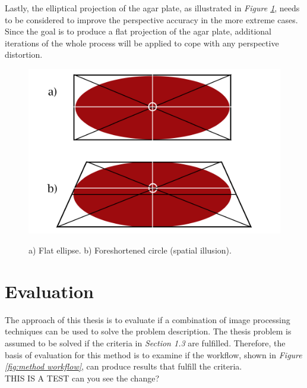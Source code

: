 \noindent Lastly, the elliptical projection of the agar plate, as illustrated in \textit{Figure \ref{fig:method projection}}, needs to be considered to improve the perspective accuracy in the more extreme cases. Since the goal is to produce a flat projection of the agar plate, additional iterations of the whole process will be applied to cope with any perspective distortion.

\begin{figure}[H]
    \centering
    \includegraphics[width=0.5\linewidth]{figures/PDF/Ellipse_projection.pdf}\\
    \caption{a) Flat ellipse. b) Foreshortened circle (spatial illusion).}
    \label{fig:method projection}
\end{figure}



\section{Evaluation}
The approach of this thesis is to evaluate if a combination of image processing techniques can be used to solve the problem description. The thesis problem is assumed to be solved if the criteria in \textit{Section 1.3} are fulfilled. Therefore, the basis of evaluation for this method is to examine if the workflow, shown in \textit{Figure \ref{fig:method workflow}}, can produce results that fulfill the criteria. \\

THIS IS A TEST can you see the change? 



